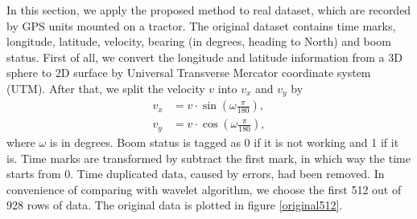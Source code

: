 In this section, we apply the proposed method to real dataset, which are recorded by GPS units mounted on a tractor. The original dataset contains time marks, longitude, latitude, velocity, bearing (in degrees,  heading to North) and boom status. First of all, we convert the longitude and latitude information from a 3D sphere to 2D surface by Universal Transverse Mercator coordinate system (UTM). After that, we split the velocity $v$ into $v_x$ and $v_y$ by 
\begin{align}
v_x &=v\cdot \sin (\omega\frac{\pi}{180}),\\
v_y &= v\cdot \cos (\omega\frac{\pi}{180}),
\end{align}
where $\omega$ is in degrees. Boom status is tagged as 0 if it is not working and 1 if it is. Time marks are transformed by subtract the first mark, in which way the time starts from 0. Time duplicated data, caused by errors, had been removed. In convenience of comparing with wavelet algorithm, we choose the first 512 out of 928 rows of data. The original data is plotted in figure \ref{original512}.


